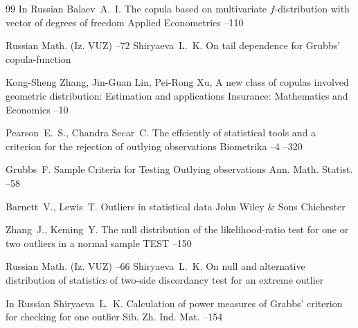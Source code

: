 \begin{thebibliography}{99}
\lang In Russian
\by Balaev~A.~I. 
\paper The copula based on multivariate $f$-distribution with vector of degrees of freedom
\jour  Applied Econometrics
--110 



\jour Russian Math. (Iz. VUZ)
--72
\by Shiryaeva~L.~K.
\paper On tail dependence for Grubbs' copula-function


\by Kong-Sheng Zhang, Jin-Guan Lin, Pei-Rong Xu,
\paper A new class of copulas involved geometric distribution: Estimation and applications
\jour Insurance: Mathematics and Economics 
--10 


\by  Pearson~E.~S., Chandra Secar~C. 
\paper The effciently of statistical tools and a criterion for the rejection of outlying observations
\jour Biometrika
--4
–320



\by  Grubbs~F.
\paper Sample Criteria for Testing Outlying observations
\jour Ann. Math. Statist.  
--58 

\by Barnett~V., Lewis~T.
\book Outliers in statistical data
\publ John Wiley \& Sons
\publaddr Chichester

\by Zhang~J., Keming~Y.
\paper  The null distribution of the likelihood-ratio test for one or two outliers in a normal sample
\jour TEST 
–150

\jour Russian Math. (Iz. VUZ)
--66
\by Shiryaeva~L.~K. 
\paper On null and alternative distribution of statistics of two-side discordancy test for an extreme outlier

\lang In Russian
\by Shiryaeva~L.~K.
\paper Calculation of power measures of Grabbs' criterion for checking for one outlier
\jour Sib. Zh. Ind. Mat.
--154


\end{thebibliography}

